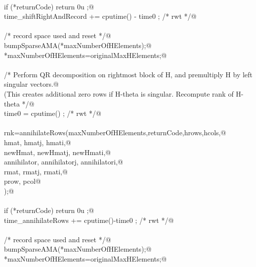 \documentclass[12pt]{article}
\begin{document}
\begin{flushleft}
\begin{minipage}{\linewidth}
\begin{list}{}{}
\mbox{}\verb@@\\
\mbox{}\verb@                if (*returnCode) return 0u ;@\\
\mbox{}\verb@                time_shiftRightAndRecord += cputime() - time0 ; /* rwt */@\\
\mbox{}\verb@@\\
\mbox{}\verb@                /* record space used and reset */@\\
\mbox{}\verb@                bumpSparseAMA(*maxNumberOfHElements);@\\
\mbox{}\verb@                *maxNumberOfHElements=originalMaxHElements;@\\
\mbox{}\verb@@\\
\mbox{}\verb@                /* Perform QR decomposition on rightmost block of H, and premultiply H by left singular vectors.@\\
\mbox{}\verb@                (This creates additional zero rows if H-theta is singular.  Recompute rank of H-theta */@\\
\mbox{}\verb@                time0 = cputime() ; /* rwt */@\\
\mbox{}\verb@@\\
\mbox{}\verb@                rnk=annihilateRows(maxNumberOfHElements,returnCode,hrows,hcols,@\\
\mbox{}\verb@                        hmat, hmatj, hmati,@\\
\mbox{}\verb@                        newHmat, newHmatj, newHmati,@\\
\mbox{}\verb@                        annihilator, annihilatorj, annihilatori,@\\
\mbox{}\verb@                        rmat, rmatj, rmati,@\\
\mbox{}\verb@                        prow, pcol@\\
\mbox{}\verb@                );@\\
\mbox{}\verb@@\\
\mbox{}\verb@                if (*returnCode) return 0u ;@\\
\mbox{}\verb@                time_annihilateRows += cputime()-time0 ; /* rwt */@\\
\mbox{}\verb@@\\
\mbox{}\verb@                /* record space used and reset */@\\
\mbox{}\verb@                bumpSparseAMA(*maxNumberOfHElements);@\\
\mbox{}\verb@                *maxNumberOfHElements=originalMaxHElements;@\\

\end{list}
\end{minipage}
\end{flushleft}
\end{document}
